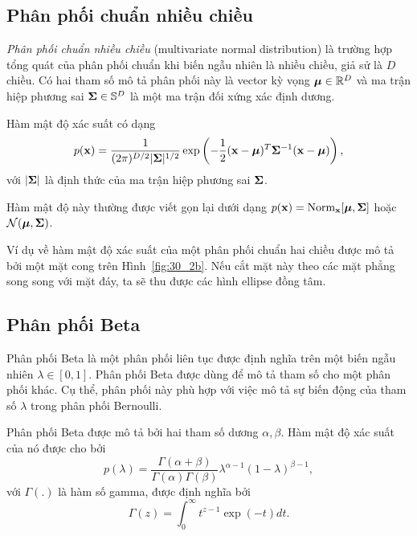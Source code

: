 \subsection{Phân phối chuẩn nhiều chiều}

\textit{Phân phối chuẩn nhiều chiều} (multivariate normal distribution) là trường hợp tổng quát của phân phối chuẩn khi biến
ngẫu nhiên là nhiều chiều, giả sử là $D$ chiều. Có hai tham số mô tả phân phối
này là {vector kỳ vọng} $\boldsymbol{\mu} \in \mathbb{R}^D$ và {ma trận hiệp phương sai}
$\mathbf{\Sigma} \in \mathbb{S}^D$ là một ma trận {đối xứng xác định dương}.

\newpage
Hàm mật độ xác suất có dạng
\begin{equation}
\label{eqn:30_33}
p(\mathbf{x}) = \frac{1}{(2\pi)^{D/2} |\mathbf{\Sigma}|^{1/2}} \exp \left(-\frac{1}{2}
(\mathbf{x} - \boldsymbol{\mu})^T \mathbf{\Sigma}^{-1} (\mathbf{x} - \boldsymbol{\mu})\right),
\end{equation}
với $|\mathbf{\Sigma}|$ là định thức của ma trận hiệp phương sai $\mathbf{\Sigma}$.

Hàm mật độ này thường được viết gọn lại dưới dạng
$p(\mathbf{x}) = \text{Norm}_{\mathbf{x}}[\boldsymbol{\mu}, \mathbf{\Sigma}]$ hoặc
$\mathcal{N}(\boldsymbol{\mu}, \mathbf{\Sigma})$.

Ví dụ về hàm mật độ xác suất của một phân phối chuẩn hai chiều được mô tả bởi
một mặt cong trên Hình~\ref{fig:30_2b}. Nếu cắt mặt này theo các mặt phẳng
song song với mặt đáy, ta sẽ thu được các hình ellipse đồng tâm.

\subsection{Phân phối Beta}
Phân phối Beta là một phân phối liên tục được định nghĩa trên một biến ngẫu
nhiên $\lambda \in [0, 1]$. Phân phối Beta được dùng để mô tả {tham số} cho một
phân phối khác. Cụ thể, phân phối này phù hợp với việc mô tả sự {biến động} của
tham số $\lambda$ trong phân phối Bernoulli.

Phân phối Beta được mô tả bởi hai tham số {dương} $\alpha, \beta$. Hàm
mật độ xác suất của nó được cho bởi
\begin{equation}
\label{eqn:30_34}
p(\lambda) = \frac{\Gamma(\alpha + \beta)}{\Gamma(\alpha) \Gamma(\beta)} \lambda^{\alpha - 1} ( 1 - \lambda) ^{\beta - 1},
\end{equation}
với $\Gamma(.)$ là hàm số gamma, được định nghĩa bởi
\begin{equation}
\Gamma(z) = \int_0^{\infty} t^{z-1}\exp(-t) dt.
\end{equation}

